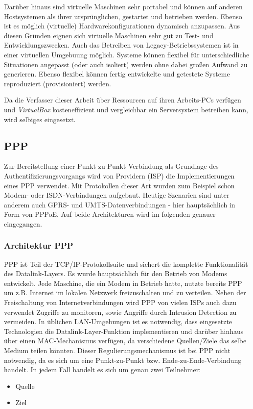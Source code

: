 Darüber hinaus sind virtuelle Maschinen sehr portabel und können auf anderen Hostsystemen als
ihrer ursprünglichen, gestartet und betrieben werden. Ebenso ist es möglich (virtuelle)
Hardwarekonfigurationen dynamisch anzupassen. Aus diesen Gründen eignen sich virtuelle
Maschinen sehr gut zu Test- und Entwicklungszwecken. Auch das Betreiben von Legacy-Betriebssystemen
ist in einer virtuellen Umgebuung möglich. Systeme können flexibel für unterschiedliche
Situationen angepasst (oder auch isoliert) werden ohne dabei großen Aufwand zu generieren.
Ebenso flexibel können fertig entwickelte und getestete Systeme reproduziert (provisioniert) werden.

Da die Verfasser dieser Arbeit über Ressourcen auf ihren Arbeits-PCs verfügen und \textit{VirtualBox}
kosteneffizient und vergleichbar ein Serversystem betreiben kann, wird selbiges eingesetzt.

\subsection{PPP}
Zur Bereitstellung einer Punkt-zu-Punkt-Verbindung als Grundlage des Authentifizierungsvorgangs
wird von Providern (\ac{ISP}) die Implementierungen eines
\ac{PPP} verwendet. Mit Protokollen dieser Art wurden zum Beispiel schon Modem- oder ISDN-Verbindungen
aufgebaut. Heutige Szenarien sind unter anderem auch GPRS- und UMTS-Datenverbindungen -
hier hauptsächlich in
Form von \ac{PPPoE}. Auf beide Architekturen wird im folgenden
genauer eingegangen.

\subsubsection{Architektur PPP}\label{subsubsection:architecture_ppp}
\ac{PPP} ist Teil der TCP/IP-Protokollsuite und sichert die komplette Funktionalität des
Datalink-Layers. Es wurde hauptsächlich für den Betrieb von Modems entwickelt. %
Jede Maschine, die ein Modem in Betrieb hatte, nutzte bereits \ac{PPP} um z.B.
Internet im lokalen Netzwerk freizuschalten und zu verteilen.
Neben der Freischaltung von Internetverbindungen wird \ac{PPP} von vielen \acp{ISP}
auch dazu verwendet Zugriffe zu monitoren, sowie Angriffe durch Intrusion Detection zu vermeiden.
In üblichen \ac{LAN}-Umgebungen ist es notwendig, dass eingesetzte Technologien die Datalink-Layer-Funktion
implementieren und darüber hinhaus über einen MAC-Mechanismus verfügen, da verschiedene
Quellen/Ziele das selbe Medium teilen könnten. Dieser Regulierungsmechanismus ist bei \ac{PPP}
nicht notwendig, da es sich um eine Punkt-zu-Punkt bzw. Ende-zu-Ende-Verbindung handelt.
In jedem Fall handelt es sich um genau zwei Teilnehmer:
\begin{itemize}
	\item Quelle
	\item Ziel
\end{itemize}

